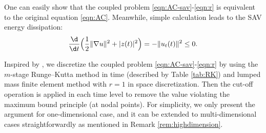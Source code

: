 One can easily show that the coupled problem \eqref{eqn:AC-sav}-\eqref{eqn:r} is equivalent to the original
equation \eqref{eqn:AC}.  Meanwhile, simple calculation leads to the SAV energy dissipation:
\begin{equation}\label{eq:SAV_energy}
  \frac{\d}{\d t} \Big(\frac12\|\nabla u\|^2 + |z(t)|^2 \Big)=-\|u_t(t)\|^2 \le 0.
\end{equation}

Inspired by \cite{akrivis2019energy},
we discretize the coupled problem \eqref{eqn:AC-sav}-\eqref{eqn:r}
by using the  $m$-stage Runge--Kutta method in time (described by Table \ref{tab:RK}) and  lumped mass
finite element method with $r=1$ in space discretization. Then the cut-off operation is applied in each time level
to remove the value violating the maximum bound principle (at nodal points).
For simplicity, we only present the argument for one-dimensional case,
and it can be extended to multi-dimensional cases straightforwardly as mentioned in Remark \ref{rem:highdimension}.

